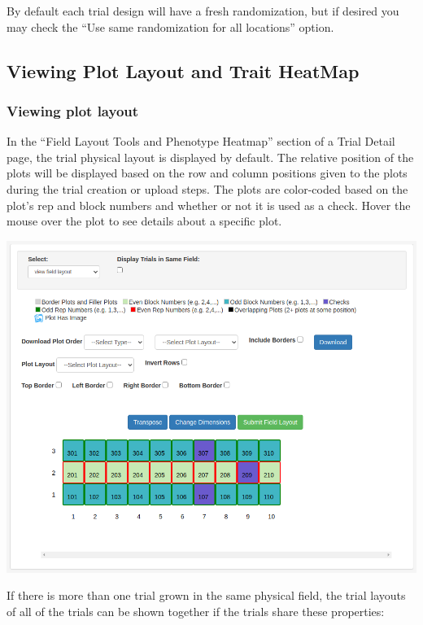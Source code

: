 \documentclass[
  12pt,
]{book}
\begin{document}
By default each trial design will have a fresh randomization, but if desired you may check the ``Use same randomization for all locations'' option.

\hypertarget{viewing-plot-layout-and-trait-heatmap}{%
\subsection{Viewing Plot Layout and Trait HeatMap}\label{viewing-plot-layout-and-trait-heatmap}}

\hypertarget{viewing-plot-layout}{%
\subsubsection{Viewing plot layout}\label{viewing-plot-layout}}

In the ``Field Layout Tools and Phenotype Heatmap'' section of a Trial Detail page, the trial physical layout is displayed by default. The relative position of the plots will be displayed based on the row and column positions given to the plots during the trial creation or upload steps. The plots are color-coded based on the plot's rep and block numbers and whether or not it is used as a check. Hover the mouse over the plot to see details about a specific plot.

\begin{center}\includegraphics[width=0.95\linewidth]{assets/images/fieldmap_trial_layout} \end{center}

If there is more than one trial grown in the same physical field, the trial layouts of all of the trials can be shown together if the trials share these properties:
\end{document}
